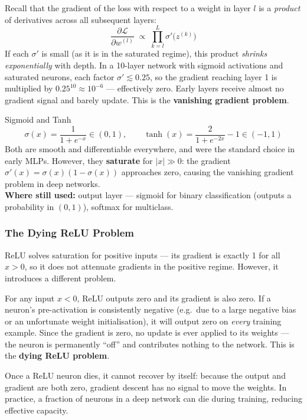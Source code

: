 \documentclass[11pt,a4paper]{article}
\newcommand{\term}[1]{\textcolor{DefGreen}{\textbf{#1}}}
\begin{document}
Recall that the gradient of the loss with respect to a weight in layer $l$ is a \emph{product} of derivatives across all subsequent layers:
\[
\frac{\partial \mathcal{L}}{\partial w^{(l)}} \;\propto\; \prod_{k=l}^{L} \sigma'\!\bigl(z^{(k)}\bigr)
\]
If each $\sigma'$ is small (as it is in the saturated regime), this product \emph{shrinks exponentially} with depth. In a 10-layer network with sigmoid activations and saturated neurons, each factor $\sigma' \lesssim 0.25$, so the gradient reaching layer 1 is multiplied by $0.25^{10} \approx 10^{-6}$ — effectively zero. Early layers receive almost no gradient signal and barely update. This is the \term{vanishing gradient problem}.

\begin{defbox}{Sigmoid and Tanh}
\[
\sigma(x) = \frac{1}{1+e^{-x}} \in (0,1), \qquad \tanh(x) = \frac{2}{1+e^{-2x}} - 1 \in (-1,1)
\]
Both are smooth and differentiable everywhere, and were the standard choice in early MLPs. However, they \textbf{saturate} for $|x| \gg 0$: the gradient $\sigma'(x) = \sigma(x)(1-\sigma(x))$ approaches zero, causing the vanishing gradient problem in deep networks.\\
\textbf{Where still used:} output layer — sigmoid for binary classification (outputs a probability in $(0,1)$), softmax for multiclass.
\end{defbox}

\subsubsection{The Dying ReLU Problem}

ReLU solves saturation for positive inputs — its gradient is exactly 1 for all $x > 0$, so it does not attenuate gradients in the positive regime. However, it introduces a different problem.

For any input $x < 0$, ReLU outputs zero and its gradient is also zero. If a neuron's pre-activation is consistently negative (e.g.\ due to a large negative bias or an unfortunate weight initialisation), it will output zero on \emph{every} training example. Since the gradient is zero, no update is ever applied to its weights — the neuron is permanently ``off'' and contributes nothing to the network. This is the \term{dying ReLU problem}.

Once a ReLU neuron dies, it cannot recover by itself: because the output and gradient are both zero, gradient descent has no signal to move the weights. In practice, a fraction of neurons in a deep network can die during training, reducing effective capacity.
\end{document}
